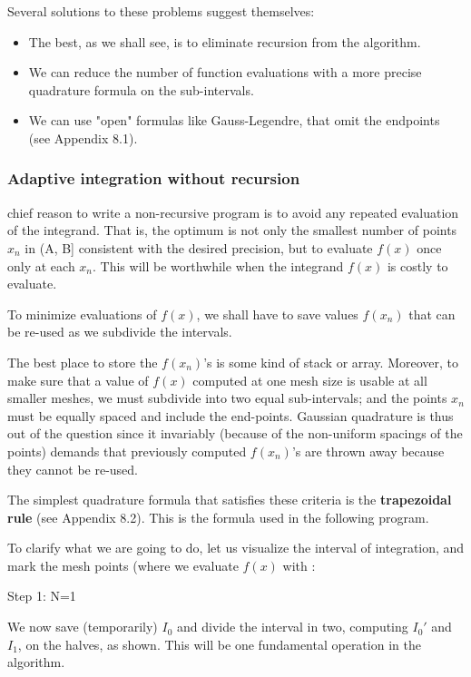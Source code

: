 Several solutions to these problems suggest themselves:
\begin{itemize}
    \item The best, as we shall see, is to eliminate recursion from the algorithm.
    \item We can reduce the number of function evaluations with a more precise quadrature formula on the sub-intervals.
    \item We can use "open" formulas like Gauss-Legendre, that omit the endpoints (see Appendix 8.1).
\end{itemize}

\subsubsection{Adaptive integration without recursion}
 chief reason to write a non-recursive program is to avoid any repeated evaluation of the integrand. That is, the optimum is not only the smallest number of points $x_n$ in (A, B] consistent with the desired precision, but to evaluate $f(x)$ once only at each $x_n$. This will be worthwhile when the integrand $f(x)$ is costly to evaluate.

To minimize evaluations of $f(x)$, we shall have to save values $f(x_n)$ that can be re-used as we subdivide the intervals.

The best place to store the $f(x_n)$’s is some kind of stack or array. Moreover, to make sure that a value of $f(x)$ computed at one mesh size is usable at all smaller meshes, we must subdivide into two equal sub-intervals; and the points $x_n$ must be equally spaced and include the end-points. Gaussian quadrature is thus out of the question since it invariably (because of the non-uniform spacings of the points) demands that previously computed $f(x_n)$'s are thrown away because they cannot be re-used.

The simplest quadrature formula that satisfies these criteria is the \textbf{trapezoidal rule} (see Appendix 8.2). This is the formula used in the following program.

To clarify what we are going to do, let us visualize the interval of integration, and mark the mesh points (where we evaluate $f(x)$ with \bc{+}:

Step 1: N=1

We now save (temporarily) $I_0$ and divide the interval in two, computing $I_{0}'$ and $I_1$, on the halves, as shown. This will be one fundamental operation in the algorithm.


